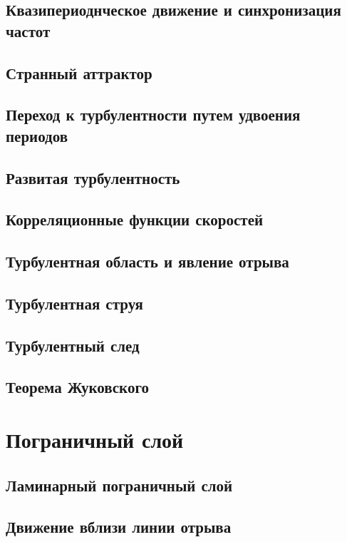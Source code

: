 \documentclass[12pt,a4paper]{book}
\begin{document}
\section{Квазипериоднческое движение и синхронизация частот}\label{sec:p30}
\section{Странный аттрактор}\label{sec:p31}
\section{Переход к турбулентности путем удвоения периодов}\label{sec:p32}
\section{Развитая турбулентность}\label{sec:p33}
\section{Корреляционные функции скоростей}\label{sec:p34}
\section{Турбулентная область и явление отрыва}\label{sec:p35}
\section{Турбулентная струя}\label{sec:p36}
\section{Турбулентный след}\label{sec:p37}
\section{Теорема Жуковского}\label{sec:p38}

\chapter{Пограничный слой}
\section{Ламинарный пограничный слой}\label{sec:p39}
\section{Движение вблизи линии отрыва}\label{sec:p40}
\end{document}
